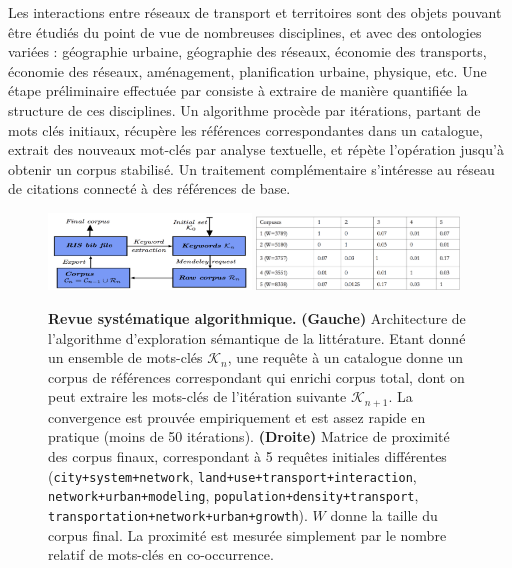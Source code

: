 Les interactions entre réseaux de transport et territoires sont des objets pouvant être étudiés du point de vue de nombreuses disciplines, et avec des ontologies variées : géographie urbaine, géographie des réseaux, économie des transports, économie des réseaux, aménagement, planification urbaine, physique, etc. Une étape préliminaire effectuée par \cite{raimbault2015models} consiste à extraire de manière quantifiée la structure de ces disciplines. Un algorithme procède par itérations, partant de mots clés initiaux, récupère les références correspondantes dans un catalogue, extrait des nouveaux mot-clés par analyse textuelle, et répète l'opération jusqu'à obtenir un corpus stabilisé. Un traitement complémentaire s'intéresse au réseau de citations connecté à des références de base.

\medskip


\medskip






\begin{figure}
\centering
\includegraphics[width=0.48\textwidth]{figures/biblio_structure}
\includegraphics[width=0.48\textwidth]{figures/biblio_results}
\caption{\textbf{Revue systématique algorithmique.} \textbf{(Gauche)} Architecture de l'algorithme d'exploration sémantique de la littérature. Etant donné un ensemble de mots-clés $\mathcal{K}_n$, une requête à un catalogue donne un corpus de références correspondant qui enrichi corpus total, dont on peut extraire les mots-clés de l'itération suivante $\mathcal{K}_{n+1}$. La convergence est prouvée empiriquement et est assez rapide en pratique (moins de 50 itérations). \textbf{(Droite)} Matrice de proximité des corpus finaux, correspondant à 5 requêtes initiales différentes (\texttt{city+system+network}, \texttt{land+use+transport+interaction}, \texttt{network+urban+modeling}, \texttt{population+density+transport}, \texttt{transportation+network+urban+growth}). $W$ donne la taille du corpus final. La proximité est mesurée simplement par le nombre relatif de mots-clés en co-occurrence.}
\label{fig:algosr}
\end{figure}

